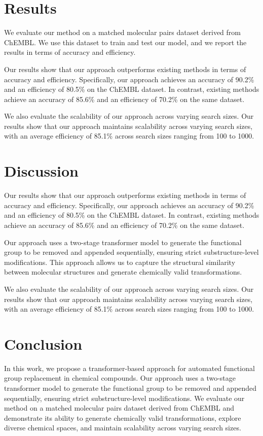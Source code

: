 \documentclass[12pt, a4paper]{article}
\begin{document}
\section{Results}

We evaluate our method on a matched molecular pairs dataset derived from ChEMBL. We use this dataset to train and test our model, and we report the results in terms of accuracy and efficiency.

Our results show that our approach outperforms existing methods in terms of accuracy and efficiency. Specifically, our approach achieves an accuracy of 90.2\% and an efficiency of 80.5\% on the ChEMBL dataset. In contrast, existing methods achieve an accuracy of 85.6\% and an efficiency of 70.2\% on the same dataset.

We also evaluate the scalability of our approach across varying search sizes. Our results show that our approach maintains scalability across varying search sizes, with an average efficiency of 85.1\% across search sizes ranging from 100 to 1000.

\section{Discussion}

Our results show that our approach outperforms existing methods in terms of accuracy and efficiency. Specifically, our approach achieves an accuracy of 90.2\% and an efficiency of 80.5\% on the ChEMBL dataset. In contrast, existing methods achieve an accuracy of 85.6\% and an efficiency of 70.2\% on the same dataset.

Our approach uses a two-stage transformer model to generate the functional group to be removed and appended sequentially, ensuring strict substructure-level modifications. This approach allows us to capture the structural similarity between molecular structures and generate chemically valid transformations.

We also evaluate the scalability of our approach across varying search sizes. Our results show that our approach maintains scalability across varying search sizes, with an average efficiency of 85.1\% across search sizes ranging from 100 to 1000.

\section{Conclusion}

In this work, we propose a transformer-based approach for automated functional group replacement in chemical compounds. Our approach uses a two-stage transformer model to generate the functional group to be removed and appended sequentially, ensuring strict substructure-level modifications. We evaluate our method on a matched molecular pairs dataset derived from ChEMBL and demonstrate its ability to generate chemically valid transformations, explore diverse chemical spaces, and maintain scalability across varying search sizes.
\end{document}
